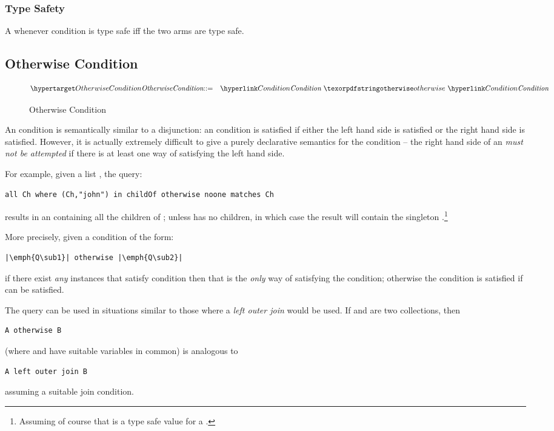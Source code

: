 \subsubsection{Type Safety}
A whenever condition is type safe iff the two arms are type safe.
\begin{prooftree}
\end{prooftree}


\subsection{Otherwise Condition}
\label{otherwiseQuery}

\begin{figure}[htbp]
\begin{eqnarray*}
\ntDef{OtherwiseCondition}&\arrow&\ntRef{Condition}\ \q{otherwise}\ \ntRef{Condition}
\end{eqnarray*}
\caption{Otherwise Condition}
\label{otherwiseConditionFormFig}
\end{figure}

An  condition is semantically similar to a disjunction: an  condition is satisfied if either the left hand side is satisfied or the right hand side is satisfied. However, it is actually extremely difficult to give a purely declarative semantics for the  condition -- the right hand side of an  \emph{must not be attempted} if there is at least one way of satisfying the left hand side.

For example, given a list , the query:
\begin{lstlisting}
all Ch where (Ch,"john") in childOf otherwise noone matches Ch
\end{lstlisting}
results in an  containing all the children of ; unless  has no children, in which case the result will contain the singleton .\footnote{Assuming of course that  is a type safe value for a .}

More precisely, given a condition of the form:
\begin{lstlisting}[escapechar=|]
|\emph{Q\sub1}| otherwise |\emph{Q\sub2}|
\end{lstlisting}
if there exist \emph{any} instances that satisfy  condition then that is the \emph{only} way of satisfying the condition; otherwise the condition is satisfied if  can be satisfied.
\begin{aside}
The  query can be used in situations similar to those where a \emph{left outer join} would be used. If  and  are two collections, then
\begin{lstlisting}
A otherwise B
\end{lstlisting}
(where  and  have suitable variables in common) is analogous to
\begin{lstlisting}
A left outer join B
\end{lstlisting}
assuming a suitable join condition.
\end{aside}

